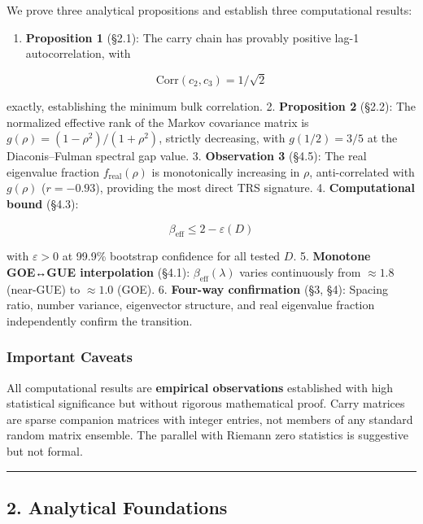 \documentclass[
  11pt,
]{article}
\providecommand{\tightlist}{%
  \setlength{\itemsep}{0pt}\setlength{\parskip}{0pt}}
\begin{document}
We prove three analytical propositions and establish three computational
results:

\begin{enumerate}
\def\labelenumi{\arabic{enumi}.}
\tightlist
\item
  \textbf{Proposition 1} (§2.1): The carry chain has provably positive lag-1
  autocorrelation, with
\end{enumerate}

\[\mathrm{Corr}(c_2, c_3) = 1/\sqrt{2}\]

exactly, establishing the minimum bulk correlation. 2. \textbf{Proposition 2}
(§2.2): The normalized effective rank of the Markov covariance matrix is
\(g(\rho) = (1-\rho^2)/(1+\rho^2)\), strictly decreasing, with \(g(1/2) = 3/5\)
at the Diaconis--Fulman spectral gap value. 3. \textbf{Observation 3} (§4.5):
The real eigenvalue fraction \(f_{\mathrm{real}}(\rho)\) is monotonically
increasing in \(\rho\), anti-correlated with \(g(\rho)\) (\(r = -0.93\)),
providing the most direct TRS signature. 4. \textbf{Computational bound} (§4.3):

\[\beta_{\mathrm{eff}} \leq 2 - \varepsilon(D)\]

with \(\varepsilon > 0\) at 99.9\% bootstrap confidence for all tested \(D\). 5.
\textbf{Monotone GOE↔GUE interpolation} (§4.1):
\(\beta_{\mathrm{eff}}(\lambda)\) varies continuously from \({\approx}1.8\)
(near-GUE) to \({\approx}1.0\) (GOE). 6. \textbf{Four-way confirmation} (§3,
§4): Spacing ratio, number variance, eigenvector structure, and real eigenvalue
fraction independently confirm the transition.

\subsubsection{Important Caveats}\label{important-caveats}

All computational results are \textbf{empirical observations} established with
high statistical significance but without rigorous mathematical proof. Carry
matrices are sparse companion matrices with integer entries, not members of any
standard random matrix ensemble. The parallel with Riemann zero statistics is
suggestive but not formal.

\begin{center}\rule{0.5\linewidth}{0.5pt}\end{center}

\newpage

\subsection{2. Analytical Foundations}\label{analytical-foundations}
\end{document}
